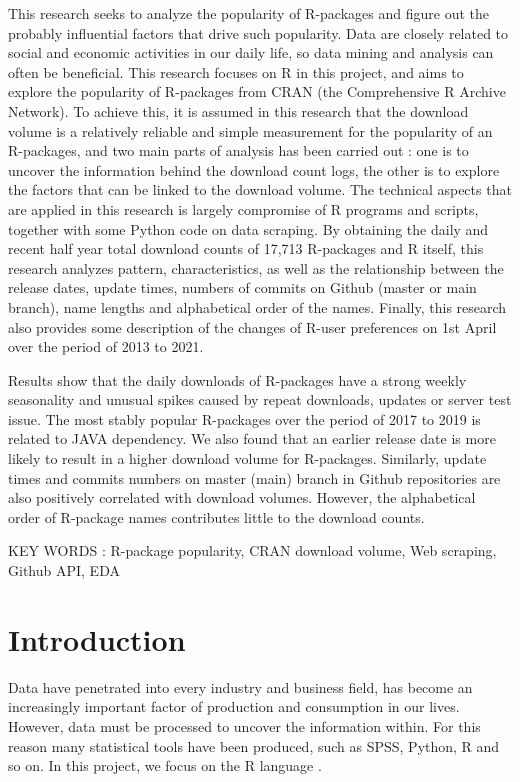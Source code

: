 \documentclass[
]{book}
\begin{document}
This research seeks to analyze the popularity of R-packages and figure out the probably influential factors that drive such popularity. Data are closely related to social and economic activities in our daily life, so data mining and analysis can often be beneficial. This research focuses on R in this project, and aims to explore the popularity of R-packages from CRAN (the Comprehensive R Archive Network). To achieve this, it is assumed in this research that the download volume is a relatively reliable and simple measurement for the popularity of an R-packages, and two main parts of analysis has been carried out : one is to uncover the information behind the download count logs, the other is to explore the factors that can be linked to the download volume. The technical aspects that are applied in this research is largely compromise of R programs and scripts, together with some Python code on data scraping. By obtaining the daily and recent half year total download counts of 17,713 R-packages and R itself, this research analyzes pattern, characteristics, as well as the relationship between the release dates, update times, numbers of commits on Github (master or main branch), name lengths and alphabetical order of the names. Finally, this research also provides some description of the changes of R-user preferences on 1st April over the period of 2013 to 2021.

Results show that the daily downloads of R-packages have a strong weekly seasonality and unusual spikes caused by repeat downloads, updates or server test issue. The most stably popular R-packages over the period of 2017 to 2019 is related to JAVA dependency. We also found that an earlier release date is more likely to result in a higher download volume for R-packages. Similarly, update times and commits numbers on master (main) branch in Github repositories are also positively correlated with download volumes. However, the alphabetical order of R-package names contributes little to the download counts.

KEY WORDS : R-package popularity, CRAN download volume, Web scraping, Github API, EDA

\hypertarget{intro}{%
\chapter{Introduction}\label{intro}}

Data have penetrated into every industry and business field, has become an increasingly important factor of production and consumption in our lives. However, data must be processed to uncover the information within. For this reason many statistical tools have been produced, such as SPSS, Python, R and so on. In this project, we focus on the R language \citep{R-base}.
\end{document}
